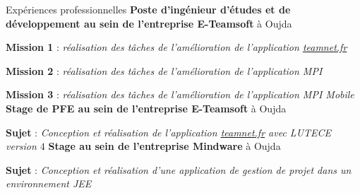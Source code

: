 \begin{rubric}{Expériences professionnelles}
%
%
	\textbf{Poste d'ingénieur d'études et de développement au sein de l’entreprise E-Teamsoft} à Oujda
	\par \textbf{Mission 1} : \emph{réalisation des tâches de l'amélioration de l'application \url{teamnet.fr} }
	\par \textbf{Mission 2} : \emph{réalisation des tâches de l'amélioration de l'application MPI}
	\par \textbf{Mission 3} : \emph{réalisation des tâches de l'amélioration de l'application MPI Mobile }
%
%
	\textbf{Stage de PFE au sein de l’entreprise E-Teamsoft} à Oujda
	\par \textbf{Sujet} : \emph{Conception et réalisation de l'application \url{teamnet.fr} avec LUTECE version $4$}
%
%
	\textbf{Stage au sein de l’entreprise Mindware} à Oujda
	\par \textbf{Sujet} : \emph{Conception et réalisation d'une application de gestion de projet dans un environnement JEE}
%
%
\end{rubric}
